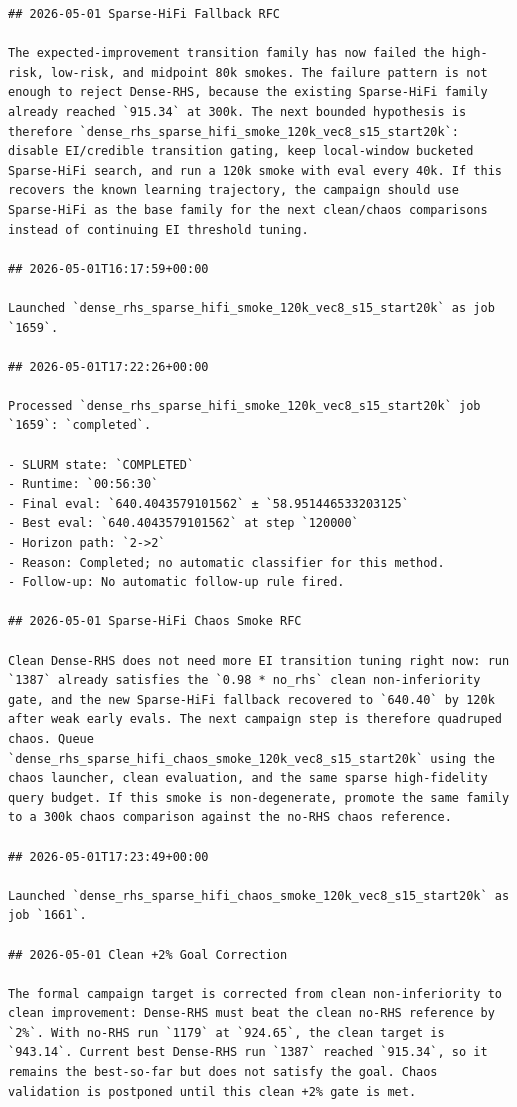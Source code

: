 \begin{verbatim}
## 2026-05-01 Sparse-HiFi Fallback RFC

The expected-improvement transition family has now failed the high-risk, low-risk, and midpoint 80k smokes. The failure pattern is not enough to reject Dense-RHS, because the existing Sparse-HiFi family already reached `915.34` at 300k. The next bounded hypothesis is therefore `dense_rhs_sparse_hifi_smoke_120k_vec8_s15_start20k`: disable EI/credible transition gating, keep local-window bucketed Sparse-HiFi search, and run a 120k smoke with eval every 40k. If this recovers the known learning trajectory, the campaign should use Sparse-HiFi as the base family for the next clean/chaos comparisons instead of continuing EI threshold tuning.

## 2026-05-01T16:17:59+00:00

Launched `dense_rhs_sparse_hifi_smoke_120k_vec8_s15_start20k` as job `1659`.

## 2026-05-01T17:22:26+00:00

Processed `dense_rhs_sparse_hifi_smoke_120k_vec8_s15_start20k` job `1659`: `completed`.

- SLURM state: `COMPLETED`
- Runtime: `00:56:30`
- Final eval: `640.4043579101562` ± `58.951446533203125`
- Best eval: `640.4043579101562` at step `120000`
- Horizon path: `2->2`
- Reason: Completed; no automatic classifier for this method.
- Follow-up: No automatic follow-up rule fired.

## 2026-05-01 Sparse-HiFi Chaos Smoke RFC

Clean Dense-RHS does not need more EI transition tuning right now: run `1387` already satisfies the `0.98 * no_rhs` clean non-inferiority gate, and the new Sparse-HiFi fallback recovered to `640.40` by 120k after weak early evals. The next campaign step is therefore quadruped chaos. Queue `dense_rhs_sparse_hifi_chaos_smoke_120k_vec8_s15_start20k` using the chaos launcher, clean evaluation, and the same sparse high-fidelity query budget. If this smoke is non-degenerate, promote the same family to a 300k chaos comparison against the no-RHS chaos reference.

## 2026-05-01T17:23:49+00:00

Launched `dense_rhs_sparse_hifi_chaos_smoke_120k_vec8_s15_start20k` as job `1661`.

## 2026-05-01 Clean +2% Goal Correction

The formal campaign target is corrected from clean non-inferiority to clean improvement: Dense-RHS must beat the clean no-RHS reference by `2%`. With no-RHS run `1179` at `924.65`, the clean target is `943.14`. Current best Dense-RHS run `1387` reached `915.34`, so it remains the best-so-far but does not satisfy the goal. Chaos validation is postponed until this clean +2% gate is met.


\end{verbatim}
